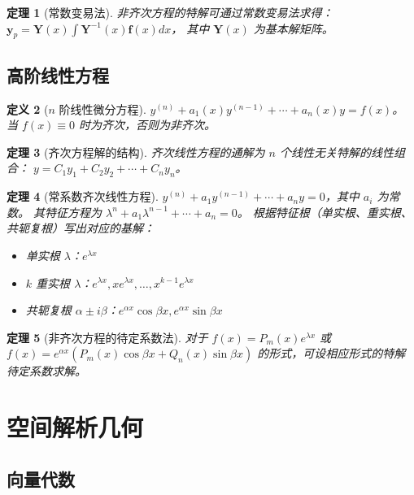 \documentclass[12pt,a4paper]{ctexart}
\newtheorem{theorem}{定理}[section]
\newtheorem{definition}[theorem]{定义}
\theoremstyle{remark}
\begin{document}
\begin{theorem}[常数变易法]
非齐次方程的特解可通过常数变易法求得：
$\mathbf{y}_p = \mathbf{Y}(x)\int \mathbf{Y}^{-1}(x)\mathbf{f}(x)dx$，
其中 $\mathbf{Y}(x)$ 为基本解矩阵。
\end{theorem}

\subsection{高阶线性方程}

\begin{definition}[$n$ 阶线性微分方程]
$y^{(n)} + a_1(x)y^{(n-1)} + \cdots + a_n(x)y = f(x)$。
当 $f(x) \equiv 0$ 时为齐次，否则为非齐次。
\end{definition}

\begin{theorem}[齐次方程解的结构]
齐次线性方程的通解为 $n$ 个线性无关特解的线性组合：
$y = C_1 y_1 + C_2 y_2 + \cdots + C_n y_n$。
\end{theorem}

\begin{theorem}[常系数齐次线性方程]
$y^{(n)} + a_1 y^{(n-1)} + \cdots + a_n y = 0$，其中 $a_i$ 为常数。
其特征方程为 $\lambda^n + a_1\lambda^{n-1} + \cdots + a_n = 0$。
根据特征根（单实根、重实根、共轭复根）写出对应的基解：
\begin{itemize}
  \item 单实根 $\lambda$：$e^{\lambda x}$
  \item $k$ 重实根 $\lambda$：$e^{\lambda x}, xe^{\lambda x}, \dots, x^{k-1}e^{\lambda x}$
  \item 共轭复根 $\alpha \pm i\beta$：$e^{\alpha x}\cos\beta x, e^{\alpha x}\sin\beta x$
\end{itemize}
\end{theorem}

\begin{theorem}[非齐次方程的待定系数法]
对于 $f(x) = P_m(x)e^{\lambda x}$ 或 $f(x) = e^{\alpha x}(P_m(x)\cos\beta x + Q_n(x)\sin\beta x)$
的形式，可设相应形式的特解待定系数求解。
\end{theorem}

\section{空间解析几何}

\subsection{向量代数}
\end{document}
